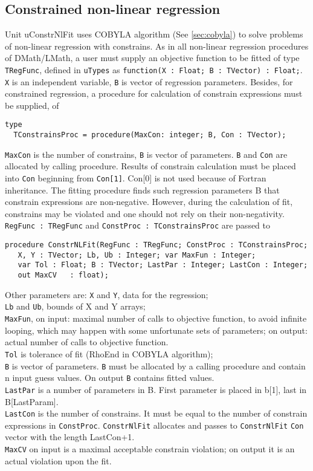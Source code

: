 \documentclass[12pt,a4paper,oneside]{article}
\newcommand{\code}[1]{\texttt{#1}}
\begin{document}
\subsection{Constrained non-linear regression}
Unit uConstrNlFit uses COBYLA algorithm (See \ref{sec:cobyla}) to solve problems of non-linear regression with constrains.
As in all non-linear regression procedures of DMath/LMath, a user must supply an objective function to be fitted of type \code{TRegFunc}, defined in \code{uTypes} as \code{function(X : Float; B : TVector) : Float;}. \code{X} is an independent variable, \code{B} is vector of regression parameters. Besides, for constrained regression, a procedure for calculation of constrain expressions must be supplied, of 
\begin{verbatim}
type
  TConstrainsProc = procedure(MaxCon: integer; B, Con : TVector);
\end{verbatim}
\code{MaxCon} is the number of constrains, \code{B} is vector of parameters. \code{B} and \code{Con} are allocated by calling procedure. Results of constrain calculation must be placed into \code{Con} beginning from \code{Con[1]}. Con[0] is not used because of Fortran inheritance. The fitting procedure finds such regression parameters B that constrain expressions are non-negative. However, during the calculation of fit, constrains may be violated and one should not rely on their non-negativity.   
\code{RegFunc : TRegFunc} and \code{ConstProc : TConstrainsProc} are passed to
\begin{verbatim}
procedure ConstrNLFit(RegFunc : TRegFunc; ConstProc : TConstrainsProc; 
   X, Y : TVector; Lb, Ub : Integer; var MaxFun : Integer; 
   var Tol : Float; B : TVector; LastPar : Integer; LastCon : Integer; 
   out MaxCV   : float);
\end{verbatim}\vspace{-6pt}
Other parameters are:
\code{X} and \code{Y}, data for the regression;\\ 
\code{Lb} and \code{Ub}, bounds of X and Y arrays;\\
\code{MaxFun}, on input: maximal number of calls to objective function, to avoid infinite looping, which may happen with some unfortunate sets of parameters; on output: actual number of calls to objective function.\\
\code{Tol} is tolerance of fit (RhoEnd in COBYLA algorithm);\\
\code{B} is vector of parameters. \code{B} must be allocated by a calling procedure and contain n input guess values. On output \code{B} contains fitted values.\\
\code{LastPar} is a number of parameters in B. First parameter is placed in b[1], last in B[LastParam].\\
\code{LastCon} is the number of constrains. It must be equal to the number of constrain expressions in \code{ConstProc}. \code{ConstrNlFit} allocates and passes to \code{ConstrNlFit} \code{Con} vector with the length LastCon+1.\\ 
\code{MaxCV} on input is a maximal acceptable constrain violation; on output it is an actual violation upon the fit.
\end{document}
